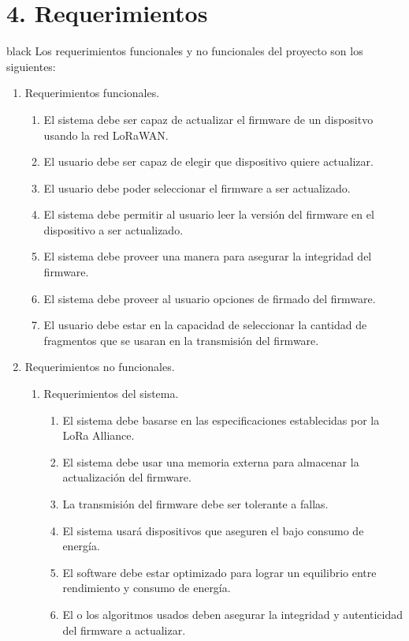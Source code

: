 \documentclass[11pt]{charter}
\begin{document}
\section{4. Requerimientos}
\label{sec:requerimientos}
\begin{consigna}{black}
Los requerimientos funcionales y no funcionales del proyecto son los siguientes:
\begin{enumerate}
\item Requerimientos funcionales.
	\begin{enumerate}
	\item El sistema debe ser capaz de actualizar el firmware de un dispositvo usando la red LoRaWAN.
	\item El usuario debe ser capaz de elegir que dispositivo quiere actualizar.
	\item El usuario debe poder seleccionar el firmware a ser actualizado.
	\item El sistema debe permitir al usuario leer la versión del firmware en el dispositivo a ser actualizado.
	\item El sistema debe proveer una manera para asegurar la integridad del firmware.
	\item El sistema debe proveer al usuario opciones de firmado del firmware.
	\item El usuario debe estar en la capacidad de seleccionar la cantidad de fragmentos que se usaran en la transmisión del firmware.
	\end{enumerate}
\item Requerimientos no funcionales.
	\begin{enumerate}
	\item Requerimientos del sistema.
	\begin{enumerate}
		\item El sistema debe basarse en las especificaciones establecidas por la LoRa Alliance\textregistered.
		\item El sistema debe usar una memoria externa para almacenar la actualización del firmware.
		\item La transmisión del firmware debe ser tolerante a fallas.
		\item El sistema usará dispositivos que aseguren el bajo consumo de energía.
		\item El software debe estar optimizado para lograr un equilibrio entre rendimiento y consumo de energía.
		\item El o los algoritmos usados deben asegurar la integridad y autenticidad del firmware a actualizar.

\end{enumerate}
\end{enumerate}
\end{enumerate}
\end{consigna}
\end{document}
